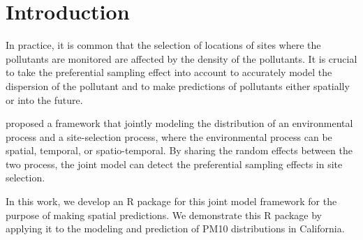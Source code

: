 \section{Introduction}
In practice, it is common that the selection of locations of sites where the pollutants 
are monitored are affected by the density of the pollutants. It is crucial to take the preferential 
sampling effect into account to accurately model the dispersion of the pollutant and to make 
predictions of pollutants either spatially or into the future.

\cite{Watson2019_pref_samp} proposed a framework that jointly modeling the distribution of an
environmental process and a site-selection process, where the environmental process can be spatial,
temporal, or spatio-temporal. By sharing the random effects between the two process, the joint
model can detect the preferential sampling effects in site selection. 

In this work, we develop an R package for this joint model framework for the purpose of making
spatial predictions. We demonstrate this R package by applying it to the modeling and prediction of
PM10 distributions in California. 